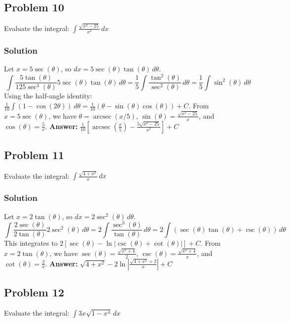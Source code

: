 \documentclass{article}
\begin{document}
\subsection{Problem 10}
Evaluate the integral: $ \int \frac{\sqrt{x^2 - 25}}{x^3} \,dx $
\subsubsection*{Solution}
Let $ x = 5 \sec(\theta) $, so $ dx = 5 \sec(\theta)\tan(\theta) \,d\theta $.
\[ \int \frac{5\tan(\theta)}{125\sec^3(\theta)} 5\sec(\theta)\tan(\theta) \,d\theta = \frac{1}{5} \int \frac{\tan^2(\theta)}{\sec^2(\theta)} \,d\theta = \frac{1}{5} \int \sin^2(\theta) \,d\theta \]
Using the half-angle identity: $ \frac{1}{10} \int (1 - \cos(2\theta)) \,d\theta = \frac{1}{10}(\theta - \sin(\theta)\cos(\theta)) + C $.
From $ x=5\sec(\theta) $, we have $ \theta=\operatorname{arcsec}(x/5) $, $ \sin(\theta)=\frac{\sqrt{x^2-25}}{x} $, and $ \cos(\theta)=\frac{5}{x} $.
\textbf{Answer:} $ \frac{1}{10}\left[\operatorname{arcsec}\left(\frac{x}{5}\right) - \frac{5\sqrt{x^2-25}}{x^2}\right] + C $


\subsection{Problem 11}
Evaluate the integral: $ \int \frac{\sqrt{4 + x^2}}{x} \,dx $
\subsubsection*{Solution}
Let $ x = 2 \tan(\theta) $, so $ dx = 2 \sec^2(\theta) \,d\theta $.
\[ \int \frac{2\sec(\theta)}{2\tan(\theta)} 2\sec^2(\theta) \,d\theta = 2 \int \frac{\sec^3(\theta)}{\tan(\theta)} \,d\theta = 2 \int (\sec(\theta)\tan(\theta) + \csc(\theta)) \,d\theta \]
This integrates to $ 2[\sec(\theta) - \ln|\csc(\theta) + \cot(\theta)|] + C $.
From $ x=2\tan(\theta) $, we have $ \sec(\theta)=\frac{\sqrt{x^2+4}}{2} $, $ \csc(\theta)=\frac{\sqrt{x^2+4}}{x} $, and $ \cot(\theta)=\frac{2}{x} $.
\textbf{Answer:} $ \sqrt{4+x^2} - 2\ln\left|\frac{\sqrt{4+x^2}+2}{x}\right| + C $


\subsection{Problem 12}
Evaluate the integral: $ \int 3x\sqrt{1 - x^4} \,dx $
\end{document}
